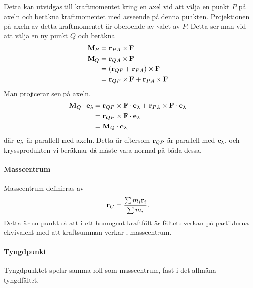 Detta kan utvidgas till kraftmomentet kring en axel vid att välja en punkt $P$ på axeln och beräkna kraftmomentet med avseende på denna punkten. Projektionen på axeln av detta kraftmomentet är oberoende av valet av $P$. Detta ser man vid att välja en ny punkt $Q$ och beräkna
\begin{align*}
	\vect{M}_P &= \vect{r}_{PA}\times\vect{F} \\
	\vect{M}_Q &= \vect{r}_{QA}\times\vect{F} \\
	           &= (\vect{r}_{QP} + \vect{r}_{PA})\times\vect{F} \\
	           &= \vect{r}_{QP}\times\vect{F} + \vect{r}_{PA}\times\vect{F}
\end{align*}
Man projicerar sen på axeln.
\begin{align*}
	\vect{M}_Q\cdot\vect{e}_\lambda &= \vect{r}_{QP}\times\vect{F}\cdot\vect{e}_\lambda + \vect{r}_{PA}\times\vect{F}\cdot\vect{e}_\lambda \\
	                                &= \vect{r}_{QP}\times\vect{F}\cdot\vect{e}_\lambda \\
	                                &= \vect{M}_Q\cdot\vect{e}_\lambda,
\end{align*}
där $\vect{e}_\lambda$ är parallell med axeln. Detta är eftersom $\vect{r}_{QP}$ är parallell med $\vect{e}_\lambda$, och kryssprodukten vi beräknar då måste vara normal på båda dessa.

\paragraph{Masscentrum}
Masscentrum definieras av
\begin{align*}
	\vect{r}_G = \frac{\sum m_i\vect{r}_i}{\sum m_i}.
\end{align*}
Detta är en punkt så att i ett homogent kraftfält är fältets verkan på partiklerna ekvivalent med att kraftsumman verkar i masscentrum.

\paragraph{Tyngdpunkt}
Tyngdpunktet spelar samma roll som masscentrum, fast i det allmäna tyngdfältet.